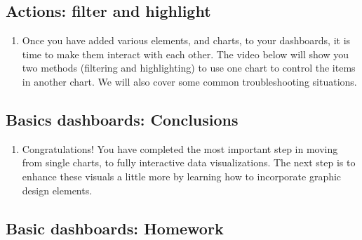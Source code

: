 \documentclass[
]{book}
\providecommand{\tightlist}{%
  \setlength{\itemsep}{0pt}\setlength{\parskip}{0pt}}
\begin{document}
\hypertarget{actions-filter-and-highlight}{%
\subsection{Actions: filter and highlight}\label{actions-filter-and-highlight}}

\begin{enumerate}
\def\labelenumi{\arabic{enumi}.}
\tightlist
\item
  Once you have added various elements, and charts, to your dashboards, it is time to make them interact with each other. The video below will show you two methods (filtering and highlighting) to use one chart to control the items in another chart. We will also cover some common troubleshooting situations.
\end{enumerate}

\hypertarget{basics-dashboards-conclusions}{%
\subsection{Basics dashboards: Conclusions}\label{basics-dashboards-conclusions}}

\begin{enumerate}
\def\labelenumi{\arabic{enumi}.}
\tightlist
\item
  Congratulations! You have completed the most important step in moving from single charts, to fully interactive data visualizations. The next step is to enhance these visuals a little more by learning how to incorporate graphic design elements.
\end{enumerate}

\hypertarget{basic-dashboards-homework}{%
\subsection{Basic dashboards: Homework}\label{basic-dashboards-homework}}
\end{document}
